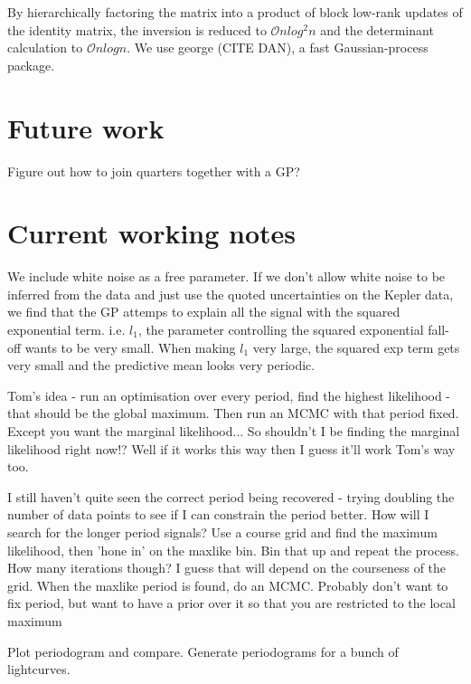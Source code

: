 \documentclass[10pt,preprint]{aastex}
\begin{document}
By hierarchically factoring the matrix into a product of block low-rank updates of the identity matrix, the inversion is reduced to $\mathcal{O}nlog^2n$ and the determinant calculation to $\mathcal{O}nlogn$.
We use george (CITE DAN), a fast Gaussian-process package.

\section{Future work}

Figure out how to join quarters together with a GP?

\section{Current working notes}

We include white noise as a free parameter.
If we don't allow white noise to be inferred from the data and just use the quoted uncertainties on the Kepler data, we find that the GP attemps to explain all the signal with the squared exponential term.
i.e. $l_1$, the parameter controlling the squared exponential fall-off wants to be very small.
When making $l_1$ very large, the squared exp term gets very small and the predictive mean looks very periodic.

Tom's idea - run an optimisation over every period, find the highest likelihood - that should be the global maximum.
Then run an MCMC with that period fixed.
Except you want the marginal likelihood...
So shouldn't I be finding the marginal likelihood right now!?
Well if it works this way then I guess it'll work Tom's way too.

I still haven't quite seen the correct period being recovered - trying doubling the number of data points to see if I can constrain the period better.
How will I search for the longer period signals?
Use a course grid and find the maximum likelihood, then 'hone in' on the maxlike bin.
Bin that up and repeat the process.
How many iterations though?
I guess that will depend on the courseness of the grid.
When the maxlike period is found, do an MCMC.
Probably don't want to fix period, but want to have a prior over it so that you are restricted to the local maximum

Plot periodogram and compare.
Generate periodograms for a bunch of lightcurves.
\end{document}
